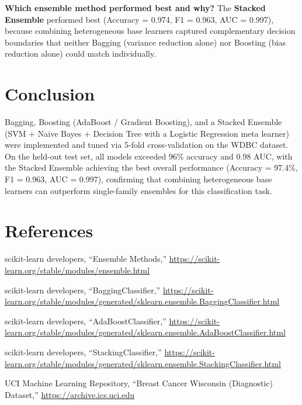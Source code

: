 \documentclass[11pt,a4paper]{article}
\begin{document}
\textbf{Which ensemble method performed best and why?}
The \textbf{Stacked Ensemble} performed best (Accuracy = 0.974, F1 = 0.963, AUC = 0.997), because
combining heterogeneous base learners captured complementary decision boundaries that neither
Bagging (variance reduction alone) nor Boosting (bias reduction alone) could match individually.

\section{Conclusion}
Bagging, Boosting (AdaBoost / Gradient Boosting), and a Stacked Ensemble (SVM + Naive Bayes +
Decision Tree with a Logistic Regression meta learner) were implemented and tuned via 5-fold
cross-validation on the WDBC dataset. On the held-out test set, all models exceeded 96\% accuracy
and 0.98 AUC, with the Stacked Ensemble achieving the best overall performance
(Accuracy = 97.4\%, F1 = 0.963, AUC = 0.997), confirming that combining heterogeneous base learners
can outperform single-family ensembles for this classification task.

\section{References}
\small
\begin{enumerate}[label={[\arabic*]}]
\item scikit-learn developers, ``Ensemble Methods,'' \url{https://scikit-learn.org/stable/modules/ensemble.html}
\item scikit-learn developers, ``BaggingClassifier,'' \url{https://scikit-learn.org/stable/modules/generated/sklearn.ensemble.BaggingClassifier.html}
\item scikit-learn developers, ``AdaBoostClassifier,'' \url{https://scikit-learn.org/stable/modules/generated/sklearn.ensemble.AdaBoostClassifier.html}
\item scikit-learn developers, ``StackingClassifier,'' \url{https://scikit-learn.org/stable/modules/generated/sklearn.ensemble.StackingClassifier.html}
\item UCI Machine Learning Repository, ``Breast Cancer Wisconsin (Diagnostic) Dataset,'' \url{https://archive.ics.uci.edu}
\end{enumerate}
\end{document}
